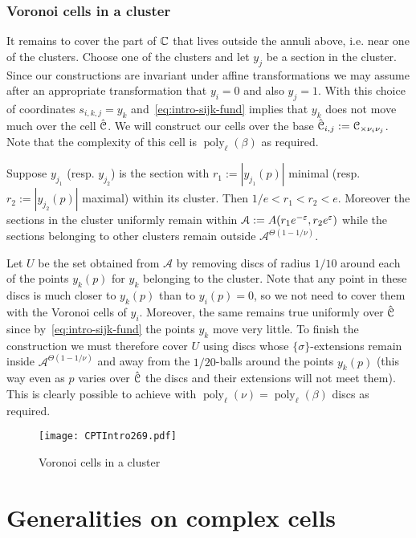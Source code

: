 \documentclass[reqno]{amsart}
\renewcommand\~[1]{\widetilde{#1}}
\def\poly{\operatorname{poly}} \def\J{\operatorname{J}}
\def\cA{{\mathcal A}}
\def\he#1{{\{#1\}}}
\def\hsigma{{\he\sigma}}
\begin{document}
  
\subsubsection{Voronoi cells in a cluster}

It remains to cover the part of ${\mathbb C}$ that lives outside the annuli
above, i.e. near one of the clusters. Choose one of the clusters and
let $y_j$ be a section in the cluster. Since our constructions are
invariant under affine transformations we may assume after an
appropriate transformation that $y_i=0$ and also $y_j=1$. With this
choice of coordinates $s_{i,k,j}=y_k$ and~\eqref{eq:intro-sijk-fund}
implies that $y_k$ does not move much over the cell $\hat{{\mathcal C}}$. We will
construct our cells over the base
$\hat{{\mathcal C}}_{i,j}:={\mathcal C}_{\times\nu_i\nu_j}$. Note that the complexity of
this cell is $\poly_\ell(\beta)$ as required.

Suppose $y_{j_1}$ (resp. $y_{j_2}$) is the section with
$r_1:=|y_{j_1}(p)|$ minimal (resp. $r_2:=|y_{j_2}(p)|$ maximal) within
its cluster. Then $1/e<r_1<r_2<e$. Moreover the sections in the
cluster uniformly remain within $\cA:=A(r_1e^{-\e},r_2e^\e)$ while the
sections belonging to other clusters remain outside
$\cA^{\Theta(1-1/\nu)}$.

Let $U$ be the set obtained from $\cA$ by removing discs of radius
$1/10$ around each of the points $y_k(p)$ for $y_k$ belonging to the
cluster. Note that any point in these discs is much closer to $y_k(p)$
than to $y_i(p)=0$, so we not need to cover them with the Voronoi
cells of $y_i$. Moreover, the same remains true uniformly over
$\hat{{\mathcal C}}$ since by~\eqref{eq:intro-sijk-fund} the points $y_k$ move
very little. To finish the construction we must therefore cover $U$
using discs whose $\hsigma$-extensions remain inside
$\cA^{\Theta(1-1/\nu)}$ and away from the $1/20$-balls around the
points $y_k(p)$ (this way even as $p$ varies over $\hat{{\mathcal C}}$ the discs
and their extensions will not meet them). This is clearly possible to
achieve with $\poly_\ell(\nu)=\poly_\ell(\beta)$ discs as required.

\begin{figure}
  \centering
  \texttt{[image: CPTIntro269.pdf]}
  \caption{Voronoi cells in a cluster}
  \label{fig:clusters-voronoi}
\end{figure}


\section{Generalities on complex cells}
\end{document}
